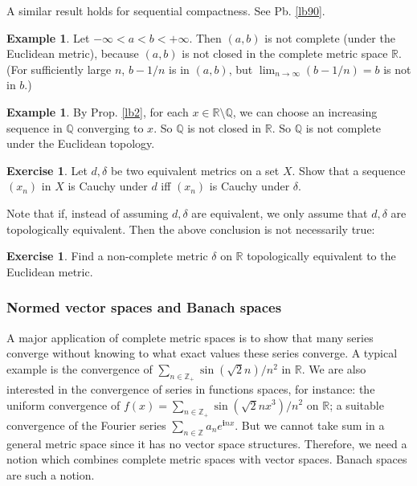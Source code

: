 \documentclass[12pt,b5paper,notitlepage]{article}
\theoremstyle{definition}
\newtheorem{eg}[df]{Example}
\newtheorem{exe}[df]{Exercise}
\theoremstyle{plain}
\newcommand{\im}{\mathbf{i}}
\newcommand{\Zbb}{\mathbb Z}
\newcommand{\Qbb}{\mathbb Q}
\newcommand{\Rbb}{\mathbb R}
\numberwithin{equation}{section}
\begin{document}
A similar result holds for sequential compactness. See Pb. \ref{lb90}.

\begin{eg}
Let $-\infty<a<b<+\infty$. Then $(a,b)$ is not complete (under the Euclidean metric), because $(a,b)$ is not closed in the complete metric space $\Rbb$. (For sufficiently large $n$, $b-1/n$ is in $(a,b)$, but $\lim_{n\rightarrow\infty} (b-1/n)=b$ is not in $b$.) 
\end{eg}

\begin{eg}
By Prop. \ref{lb2}, for each $x\in\Rbb\setminus\Qbb$, we can choose an increasing sequence in $\Qbb$ converging to $x$. So $\Qbb$ is not closed in $\Rbb$. So $\Qbb$ is not complete under the Euclidean topology.
\end{eg}


\begin{exe}
Let $d,\delta$ be two equivalent metrics on a set $X$. Show that a sequence $(x_n)$ in $X$ is Cauchy under $d$ iff $(x_n)$ is Cauchy under $\delta$. 

Note that if, instead of assuming $d,\delta$ are equivalent, we only assume that $d,\delta$ are topologically equivalent. Then the above conclusion is not necessarily true:
\end{exe}


\begin{exe}
Find a non-complete metric $\delta$ on $\Rbb$ topologically equivalent to the Euclidean metric.
\end{exe}




\subsubsection{Normed vector spaces and Banach spaces}



A major application of complete metric spaces is to show that many series converge without knowing to what exact values these series converge. A typical example is the convergence of $\sum_{n\in\Zbb_+}\sin(\sqrt 2n)/n^2$ in $\Rbb$. We are also interested in the convergence of series in functions spaces, for instance: the uniform convergence of $f(x)=\sum_{n\in\Zbb_+}\sin(\sqrt 2nx^3)/n^2$ on $\Rbb$; a suitable convergence of the Fourier series $\sum_{n\in\Zbb}a_ne^{\im n x}$. But we cannot take sum in a general metric space since it has no vector space structures. Therefore, we need a notion which combines complete metric spaces with vector spaces. Banach spaces are such a notion. 
\end{document}
